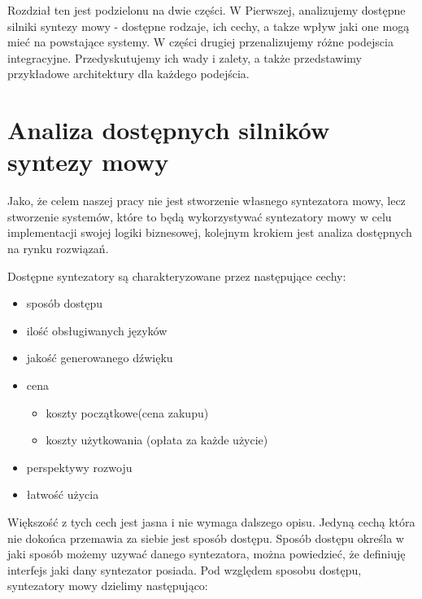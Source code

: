 Rozdział ten jest podzielonu na dwie części. W Pierwszej, analizujemy dostępne silniki syntezy mowy - dostępne rodzaje, ich cechy, a takze wpływ jaki one mogą mieć na powstające systemy. W części drugiej przenalizujemy różne podejscia integracyjne. Przedyskutujemy ich wady i zalety, a także przedstawimy przykładowe architektury dla każdego podejścia. 

\section {Analiza dostępnych silników syntezy mowy}

Jako, że celem naszej pracy nie jest stworzenie własnego syntezatora mowy, lecz stworzenie systemów, które to będą wykorzystywać syntezatory mowy w celu implementacji swojej logiki biznesowej, kolejnym krokiem jest analiza dostępnych na rynku rozwiązań. 

Dostępne syntezatory są charakteryzowane przez następujące cechy:
\begin{itemize}
	\item sposób dostępu
	\item ilość obsługiwanych języków
	\item jakość generowanego dźwięku
	\item cena
	\begin{itemize}
		\item koszty początkowe(cena zakupu)
		\item koszty użytkowania (opłata za każde użycie)
	\end{itemize}
	\item perspektywy rozwoju
	\item łatwość użycia
\end{itemize}

Większość z tych cech jest jasna i nie wymaga dalszego opisu. Jedyną cechą która nie dokońca przemawia za siebie jest sposób dostępu. Sposób dostępu określa w jaki sposób możemy uzywać danego syntezatora, można powiedzieć, że definiuję interfejs jaki dany syntezator posiada. Pod względem sposobu dostępu, syntezatory mowy dzielimy następująco:

